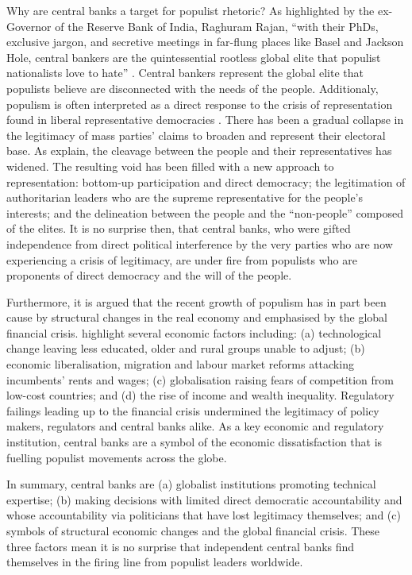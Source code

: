 \documentclass[11pt]{article}
\begin{document}
Why are central banks a target for populist rhetoric? As highlighted by the ex-Governor of the Reserve Bank of India, Raghuram Rajan, ``with their PhDs, exclusive jargon, and secretive meetings in far-flung places like Basel and Jackson Hole, central bankers are the quintessential rootless global elite that populist nationalists love to hate'' \citep{rajan2017central}. Central bankers represent the global elite that populists believe are disconnected with the needs of the people. Additionaly, populism is often interpreted as a direct response to the crisis of representation found in liberal representative democracies \citep{de2018populism}. There has been a gradual collapse in the legitimacy of mass parties' claims to broaden and represent their electoral base.  As \cite{de2018populism} explain, the cleavage between the people and their representatives has widened. The resulting void has been filled with a new approach to representation: bottom-up participation and direct democracy; the legitimation of authoritarian leaders who are the supreme representative for the people's interests; and the delineation between the people and the ``non-people'' composed of the elites. It is no surprise then, that central banks, who were gifted independence from direct political interference by the very parties who are now experiencing a crisis of legitimacy, are under fire from populists who are proponents of direct democracy and the will of the people. 

Furthermore, it is argued that the recent growth of populism has in part been cause by structural changes in the real economy and emphasised by the global financial crisis. \citep{gnan2020populism} highlight several economic factors including: (a) technological change leaving less educated, older and rural groups unable to adjust; (b) economic liberalisation, migration and labour market reforms attacking incumbents’ rents and wages; (c) globalisation raising fears of competition from low-cost countries; and (d) the rise of income and wealth inequality. Regulatory failings leading up to the financial crisis \citep{turner12017did} undermined the legitimacy of policy makers, regulators and central banks alike. As a key economic and regulatory institution, central banks are a symbol of the economic dissatisfaction that is fuelling populist movements across the globe.

In summary, central banks are (a) globalist institutions promoting technical expertise; (b) making decisions with limited direct democratic accountability and whose accountability via politicians that have lost legitimacy themselves; and (c) symbols of structural economic changes and the global financial crisis. These three factors mean it is no surprise that independent central banks find themselves in the firing line from populist leaders worldwide.
\end{document}
